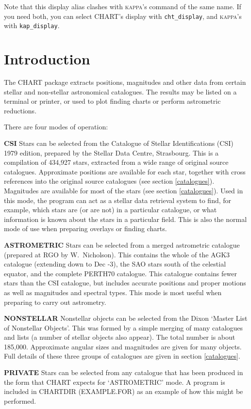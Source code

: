 \documentclass{article}
\begin{document}
Note that this display alias clashes with \textsc{kappa}'s command of
the same name.  If you need both, you can select CHART's
display with \texttt{cht\_display}, and \textsc{kappa}'s with
\texttt{kap\_display}.


\section{Introduction}

The CHART package extracts positions, magnitudes and other data from certain
stellar and non-stellar astronomical catalogues.
The results may be listed on a terminal or printer, or used to plot finding
charts or perform astrometric reductions.

There are four modes of operation:
\begin{list}{}{\setlength{\leftmargin}{20mm}
\setlength{\labelsep}{5mm}
\setlength{\labelwidth}{5mm}
}
\item[{\bf CSI}]
Stars can be selected from the Catalogue of Stellar Identifications (CSI) 1979
edition, prepared by the Stellar Data Centre, Strasbourg.
This is a compilation of 434,927 stars, extracted from a wide range of original
source catalogues.
Approximate positions are available for each star, together with cross
references into the original source catalogues (see section \ref{catalogues}).
Magnitudes are available for most of the stars (see section \ref{catalogues}).
Used in this mode, the program can act as a stellar data retrieval system to
find, for example, which stars are (or are not) in a particular catalogue, or
what information is known about the stars in a particular field.
This is also the normal mode of use when preparing overlays or finding charts.
\item[{\bf ASTROMETRIC}]
Stars can be selected from a merged astrometric catalogue (prepared at RGO by
W.~Nicholson).
This contains the whole of the AGK3 catalogue (extending down to Dec -3), the
SAO stars south of the celestial equator, and the complete PERTH70 catalogue.
This catalogue contains fewer stars than the CSI catalogue, but includes
accurate positions and proper motions as well as magnitudes and spectral types.
This mode is most useful when preparing to carry out astrometry.
\item[{\bf NONSTELLAR}]
Nonstellar objects can be selected from the Dixon `Master List of Nonstellar
Objects'.
This was formed by a simple merging of many catalogues and lists (a number of
stellar objects also appear).
The total number is about 185,000.
Approximate angular sizes and magnitudes are given for many objects.
Full details of these three groups of catalogues are given in section
\ref{catalogues}.
\item[{\bf PRIVATE}]
Stars can be selected from any catalogue that has been produced in the form that
CHART expects for `ASTROMETRIC' mode.
A program is included in CHARTDIR (EXAMPLE.FOR) as an example of how this might
be performed.
\end{list}
\end{document}
